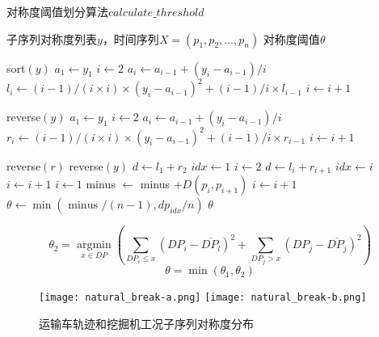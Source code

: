 \begin{algorithm}
  \caption{对称度阈值划分算法$calculate\_threshold$}
  \label{alg:threshold}
  \small
  \begin{algorithmic}
    \REQUIRE 子序列对称度列表$y$，时间序列$X=\left(p_{1}, p_{2}, \dots, p_{n}\right)$
    \ENSURE 对称度阈值$\theta$

    \STATE sort$(y)$
    \STATE $a_1 \leftarrow y_1$
    \STATE $i \leftarrow 2$
    \STATE $a_i \leftarrow a_{i-1}+(y_i-a_{i-1})/{i}$
    \STATE $l_i \leftarrow (i-1) / (i \times i) \times(y_i-a_{i-1})^{2}+(i-1) / i \times l_{i-1}$
    \STATE $i \leftarrow i+1$
    \ENDWHILE

    \STATE reverse$(y)$
    \STATE $a_1 \leftarrow y_1$
    \STATE $i \leftarrow 2$
    \STATE $a_i \leftarrow a_{i-1}+(y_i-a_{i-1})/{i}$
    \STATE $r_i \leftarrow (i-1) / (i \times i) \times(y_i-a_{i-1})^{2}+(i-1) / i \times r_{i-1}$
    \STATE $i \leftarrow i+1$
    \ENDWHILE

    \STATE reverse$(r)$
    \STATE reverse$(y)$
    \STATE $d \leftarrow l_1 + r_2$
    \STATE $idx \leftarrow 1$
    \STATE $i \leftarrow 2$
    \STATE $d \leftarrow l_i + r_{i+1}$
    \STATE $idx \leftarrow i$
    \ENDIF
    \STATE $i \leftarrow i+1$
    \ENDWHILE
    \STATE $i \leftarrow 1$
    \STATE minus $\leftarrow$ minus $+D\left(p_{i}, p_{i+1}\right)$
    \STATE $i \leftarrow i+1$
    \ENDWHILE
    \STATE $\theta \leftarrow \min \left({\text { minus }} / (n-1), {dp_{idx}} / {n}\right)$
    \RETURN $\theta$
  \end{algorithmic}
\end{algorithm}

\begin{equation}
  \theta_{2}=\underset{x \in D P}{\operatorname{argmin}}\left(\sum_{D P_{i} \leq x}\left(D P_{i}-\overline{D P_{l}}\right)^{2}+\sum_{D P_{j}>x}\left(D P_{j}-\overline{D P_{j}}\right)^{2}\right)
  \label{eq:threshold2}
\end{equation}
\begin{equation}
  \theta=\min \left(\theta_{1}, \theta_{2}\right)
  \label{eq:threshold}
\end{equation}
\begin{figure}
  \centering
  {\texttt{[image: natural\_break-a.png]}}
  {\texttt{[image: natural\_break-b.png]}}
  \caption{运输车轨迹和挖掘机工况子序列对称度分布}
  \label{fig:natural_break}
\end{figure}

